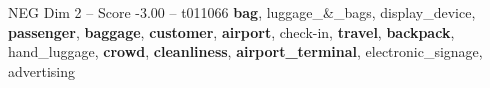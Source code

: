 \begin{textsample}{NEG Dim 2 – Score -3.00 – t011066}  \label{ex:f2_neg_029}
\textbf{bag}, luggage\_\&\_bags, display\_device, \textbf{passenger}, \textbf{baggage}, \textbf{customer}, \textbf{airport}, check-in, \textbf{travel}, \textbf{backpack}, hand\_luggage, \textbf{crowd}, \textbf{cleanliness}, \textbf{airport\_terminal}, electronic\_signage, advertising

\end{textsample}
